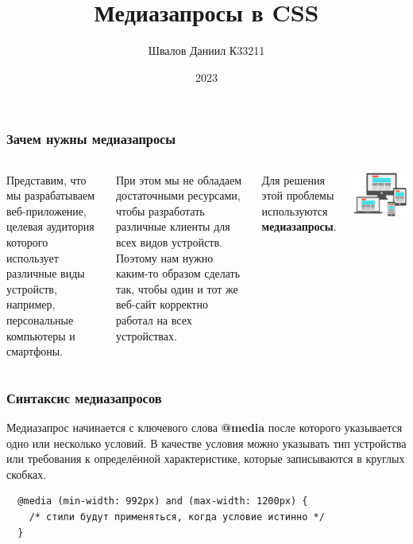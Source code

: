 \documentclass[aspectratio=169]{beamer}
\title{
  \huge{
    Медиазапросы в CSS
  }
}
\author{Швалов Даниил К33211}
\institute{Университет ИТМО}
\date{2023}
\begin{document}
\def\labelitemi{---}

\frame{\titlepage}

\begin{frame}
  \frametitle{Зачем нужны медиазапросы}

  \begin{columns}[onlytextwidth,c]

    Представим, что мы разрабатываем веб-приложение, целевая аудитория которого
    использует различные виды устройств, например, персональные компьютеры и
    смартфоны.

    \vspace*{1em}

    При этом мы не обладаем достаточными ресурсами, чтобы разработать
    различные клиенты для всех видов устройств. Поэтому нам нужно каким-то
    образом сделать так, чтобы один и тот же веб-сайт корректно работал на всех
    устройствах.

    \vspace*{1em}

    Для решения этой проблемы используются \textbf{медиазапросы}.


    \includegraphics[width=\textwidth]{images/responsive-design.png}
  \end{columns}
\end{frame}

\begin{frame}[fragile]
  \frametitle{Синтаксис медиазапросов}

  Медиазапрос начинается с ключевого слова \textbf{@media} после которого
  указывается одно или несколько условий. В качестве условия можно указывать тип
  устройства или требования к определённой характеристике, которые записываются
  в круглых скобках.

  \vspace*{1em}

  \begin{verbatim}
  @media (min-width: 992px) and (max-width: 1200px) {
    /* стили будут применяться, когда условие истинно */
  }
  \end{verbatim}
\end{frame}
\end{document}
